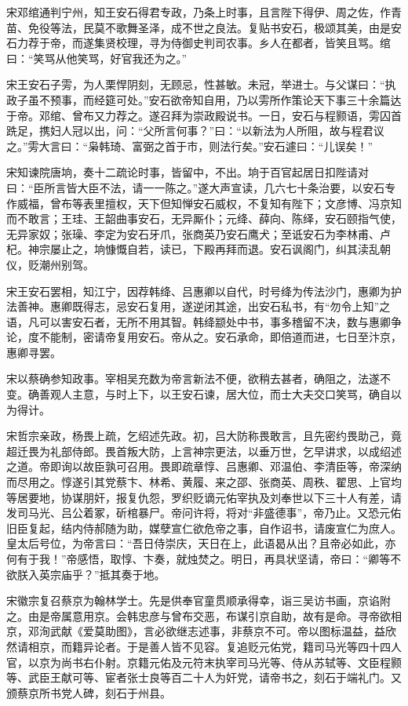 \documentclass[a4paper,12pt,UTF8,twoside]{ctexbook}
\begin{document}
    宋邓绾通判宁州，知王安石得君专政，乃条上时事，且言陛下得伊、周之佐，作青苗、免役等法，民莫不歌舞圣泽，成不世之良法。复贴书安石，极颂其美，由是安石力荐于帝，而遂集贤校理，寻为侍御史判司农事。乡人在都者，皆笑且骂。绾曰：“笑骂从他笑骂，好官我还为之。”
    
    宋王安石子雱，为人栗悍阴刻，无顾忌，性甚敏。未冠，举进士。与父谋曰：“执政子虽不预事，而经筵可处。”安石欲帝知自用，乃以雱所作策论天下事三十余篇达于帝。邓绾、曾布又力荐之。遂召拜为崇政殿说书。一日，安石与程颢语，雱囚首跣足，携妇人冠以出，问：“父所言何事？”曰：“以新法为人所阻，故与程君议之。”雱大言曰：“枭韩琦、富弼之首于市，则法行矣。”安石遽曰：“儿误矣！”
    
    宋知谏院唐垧，奏十二疏论时事，皆留中，不出。垧于百官起居日扣陛请对曰：“臣所言皆大臣不法，请一一陈之。”遂大声宣读，几六七十条治要，以安石专作威福，曾布等表里擅权，天下但知惮安石威权，不复知有陛下；文彦博、冯京知而不敢言；王珪、王韶曲事安石，无异厮仆；元绛、薛向、陈绎，安石颐指气使，无异家奴；张璪、李定为安石牙爪，张商英乃安石鹰犬；至诋安石为李林甫、卢杞。神宗屡止之，垧慷慨自若，读已，下殿再拜而退。安石讽阁门，纠其渎乱朝仪，贬潮州别驾。
    
    宋王安石罢相，知江宁，因荐韩绛、吕惠卿以自代，时号绛为传法沙门，惠卿为护法善神。惠卿既得志，忌安石复用，遂逆闭其途，出安石私书，有“勿令上知”之语，凡可以害安石者，无所不用其智。韩绛颛处中书，事多稽留不决，数与惠卿争论，度不能制，密请帝复用安石。帝从之。安石承命，即倍道而进，七日至汴京，惠卿寻罢。
    
    宋以蔡确参知政事。宰相吴充数为帝言新法不便，欲稍去甚者，确阻之，法遂不变。确善观人主意，与时上下，以王安石谏，居大位，而士大夫交口笑骂，确自以为得计。
    
    宋哲宗亲政，杨畏上疏，乞绍述先政。初，吕大防称畏敢言，且先密约畏助己，竟超迁畏为礼部侍郎。畏首叛大防，上言神宗更法，以垂万世，乞早讲求，以成绍述之道。帝即询以故臣孰可召用。畏即疏章惇、吕惠卿、邓温伯、李清臣等，帝深纳而尽用之。惇遂引其党蔡卞、林希、黄履、来之邵、张商英、周秩、翟思、上官均等居要地，协谋朋奸，报复仇怨，罗织贬谪元佑宰执及刘奉世以下三十人有差，请发司马光、吕公着冢，斫棺暴尸。帝问许将，将对“非盛德事”，帝乃止。又恐元佑旧臣复起，结内侍郝随为助，媒孽宣仁欲危帝之事，自作诏书，请废宣仁为庶人。皇太后号位，为帝言曰：“吾日侍崇庆，天日在上，此语曷从出？且帝必如此，亦何有于我！”帝感悟，取惇、卞奏，就烛焚之。明日，再具状坚请，帝曰：“卿等不欲朕入英宗庙乎？”抵其奏于地。
    
    宋徽宗复召蔡京为翰林学士。先是供奉官童贯顺承得幸，诣三吴访书画，京谄附之。由是帝属意用京。会韩忠彦与曾布交恶，布谋引京自助，故有是命。寻帝欲相京，邓洵武献《爱莫助图》，言必欲继志述事，非蔡京不可。帝以图标温益，益欣然请相京，而籍异论者。于是善人皆不见容。复追贬元佑党，籍司马光等四十四人官，以京为尚书右仆射。京籍元佑及元符末执宰司马光等、侍从苏轼等、文臣程颢等、武臣王献可等、宦者张士良等百二十人为奸党，请帝书之，刻石于端礼门。又颁蔡京所书党人碑，刻石于州县。
    
\end{document}
